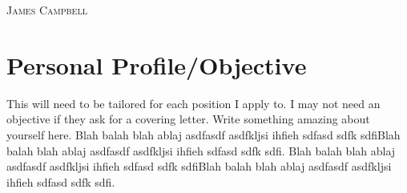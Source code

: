 \documentclass[a4paper, 11pt]{article}
\begin{document}
\pagestyle{empty} %

\begin{multicols}{2}

\raggedright{\textsc{\Huge{James Campbell}}}\\
\columnbreak
{}

\end{multicols}
\section{Personal Profile/Objective}
\begin{flushleft}
This will need to be tailored for each position I apply to. I may not need an objective if they ask for a covering letter.
Write something amazing about yourself here. Blah balah blah ablaj asdfasdf asdfkljsi ihfieh sdfasd sdfk sdfiBlah balah blah ablaj asdfasdf asdfkljsi ihfieh sdfasd sdfk sdfi. Blah balah blah ablaj asdfasdf asdfkljsi ihfieh sdfasd sdfk sdfiBlah balah blah ablaj asdfasdf asdfkljsi ihfieh sdfasd sdfk sdfi.
\end{flushleft}
\end{document}

